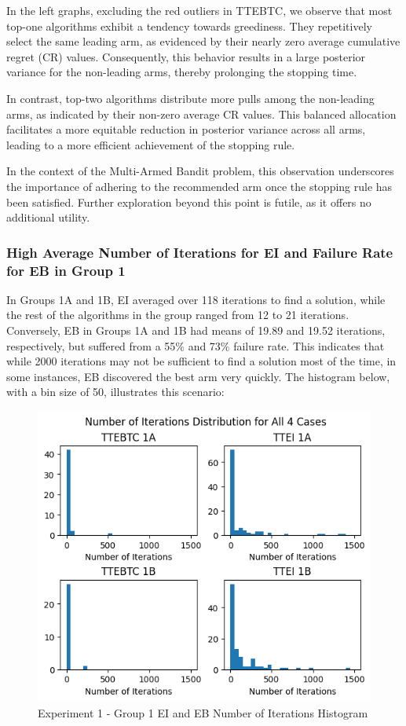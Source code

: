 \documentclass[a4paper, 12pt]{article}
\theoremstyle{definition}
\begin{document}
In the left graphs, excluding the red outliers in TTEBTC, we observe that most top-one algorithms exhibit a tendency towards greediness. They repetitively select the same leading arm, as evidenced by their nearly zero average cumulative regret (CR) values. Consequently, this behavior results in a large posterior variance for the non-leading arms, thereby prolonging the stopping time.

In contrast, top-two algorithms distribute more pulls among the non-leading arms, as indicated by their non-zero average CR values. This balanced allocation facilitates a more equitable reduction in posterior variance across all arms, leading to a more efficient achievement of the stopping rule.

In the context of the Multi-Armed Bandit problem, this observation underscores the importance of adhering to the recommended arm once the stopping rule has been satisfied. Further exploration beyond this point is futile, as it offers no additional utility.

\subsubsection{High Average Number of Iterations for EI and Failure Rate for EB in Group 1}
In Groups 1A and 1B, EI averaged over 118 iterations to find a solution, while the rest of the algorithms in the group ranged from 12 to 21 iterations. Conversely, EB in Groups 1A and 1B had means of 19.89 and 19.52 iterations, respectively, but suffered from a 55\% and 73\% failure rate. This indicates that while 2000 iterations may not be sufficient to find a solution most of the time, in some instances, EB discovered the best arm very quickly. The histogram below, with a bin size of 50, illustrates this scenario:

\begin{figure}[H] \centering
\includegraphics{figures/exp1_itercount.png} 
\caption{Experiment 1 - Group 1 EI and EB Number of Iterations Histogram}
\label{figure:exp1_itercount}
\end{figure}
\end{document}
